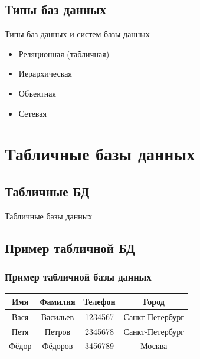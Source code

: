 \documentclass[compress,red]{beamer}
\begin{document}
\subsection{Типы баз данных}
\begin{frame}
  \begin{center}
    \Huge{Типы баз данных и систем базы данных}
  \end{center}
  \begin{center}
    \begin{itemize}
      \item \Large{Реляционная (табличная)}
      \item \Large{Иерархическая}
      \item \Large{Объектная}
      \item \Large{Сетевая}
    \end{itemize}
  \end{center}
\end{frame}

\section{Табличные базы данных}
\subsection{Табличные БД}
\begin{frame}
  \begin{center}
    \Huge{Табличные базы данных}
  \end{center}
\end{frame}

\subsection{Пример табличной БД}
\begin{frame}[fragile]
  \frametitle{Пример табличной базы данных}
  \begin{center}
    \begin{tabular}{|c|c|c|c|}
    \hline
    \textbf{Имя} & \textbf{Фамилия} & \textbf{Телефон} & \textbf{Город}\\
    \hline
    Вася & Васильев & 1234567 & Санкт-Петербург\\
    \hline
    Петя & Петров & 2345678 & Санкт-Петербург\\
    \hline
    Фёдор & Фёдоров & 3456789 & Москва\\
    \hline
    \end{tabular}
  \end{center}
\end{frame}
\end{document}
